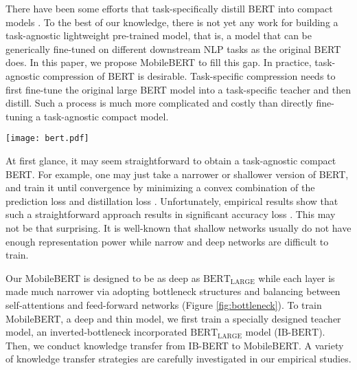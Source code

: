 \documentclass[11pt,a4paper]{article}
\begin{document}
There have been some efforts that task-specifically distill BERT into compact models  \citep{turc2019well,tang2019distilling,sun2019patient,tsai2019small}. To the best of our knowledge,  there is not yet any work for building a task-agnostic lightweight pre-trained model, that is, a model that can be generically fine-tuned on different downstream NLP tasks as the original BERT does. In this paper, we propose MobileBERT to fill this gap.  In practice,  task-agnostic compression of BERT is desirable.  Task-specific compression needs to first fine-tune the original large BERT model into a task-specific teacher and then distill. Such a process is much more complicated \citep{wu2019conditional} and costly than directly fine-tuning a task-agnostic compact model. 



\begin{figure*}[t]
	\centering
	\texttt{[image: bert.pdf]}
\caption{Illustration of three models:  (a) BERT; (b) Inverted-Bottleneck BERT (IB-BERT); and (c) MobileBERT.  In (b) and (c),
	\textcolor{myred}{red lines denote {inter-block} flows} while \textcolor{myblue}{{blue lines} {intra-block} flows}. MobileBERT is  trained by layer-to-layer imitating IB-BERT.  
}
\label{fig:bottleneck}
\end{figure*}

At first glance, it may seem straightforward to obtain a task-agnostic compact BERT.  For example, one may just take a narrower or shallower version of BERT, and train it until convergence by minimizing a convex combination of the prediction loss and distillation loss \citep{turc2019well, sun2019patient}. Unfortunately, empirical results show that such a straightforward approach results in significant accuracy loss \citep{turc2019well}.  This may not be that surprising. It is well-known that shallow networks usually do not have enough representation power while narrow and deep networks are difficult to train. 

Our MobileBERT is designed to be as deep as $\text{BERT}_\text{LARGE}$ 
while each layer is made much narrower via adopting bottleneck structures and balancing between self-attentions and feed-forward networks (Figure \ref{fig:bottleneck}). To train MobileBERT, a deep and thin model,  we  
first train a specially designed teacher model, an inverted-bottleneck incorporated $\text{BERT}_\text{LARGE}$ model ($\text{IB-BERT}$). Then, we conduct knowledge transfer from IB-BERT to MobileBERT. A variety of knowledge transfer strategies are carefully investigated in our empirical studies.  
\end{document}
